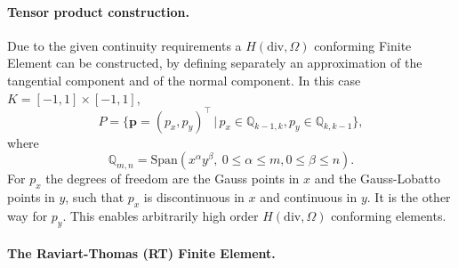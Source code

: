 \paragraph{Tensor product construction.} Due to the given continuity requirements a $H(\textrm{div}, \Omega)$ conforming Finite Element can be constructed, by defining separately an approximation of the tangential component and of the normal component. 
In this case $K=[-1,1]\times [-1,1]$, 
$$ P = \{ \mathbf{p}=(p_x,p_y)^\top \,|\, p_x\in \mathbb{Q}_{k-1,k}, p_y\in \mathbb{Q}_{k,k-1}\},$$
where 
$$ \mathbb{Q}_{m,n}= \mathrm{Span} ( x^\alpha y^\beta,  ~ 0\leq \alpha\leq m, 0\leq \beta\leq n).$$
For $p_x$ the degrees of freedom are the Gauss points in $x$ and the Gauss-Lobatto points in $y$, such that $p_x$ is discontinuous in $x$ and continuous in $y$. It is the other way for $p_y$.
This enables arbitrarily high order   $H(\textrm{div}, \Omega)$ conforming elements.

\paragraph{The Raviart-Thomas (RT) Finite Element.}

